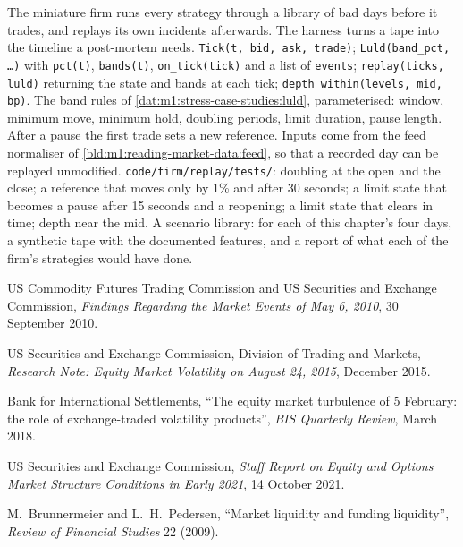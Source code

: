 \begin{build}
 The miniature firm runs every strategy through a library of
bad days before it trades, and replays its own incidents afterwards. The
harness turns a tape into the timeline a post-mortem needs.
 \texttt{Tick(t, bid, ask, trade)}; \texttt{Luld(band\_pct,
\ldots)} with \texttt{pct(t)}, \texttt{bands(t)}, \texttt{on\_tick(tick)} and a
list of \texttt{events}; \texttt{replay(ticks, luld)} returning the state and
bands at each tick; \texttt{depth\_within(levels, mid, bp)}.
 The band rules of \cref{dat:m1:stress-case-studies:luld},
parameterised: window, minimum move, minimum hold, doubling periods, limit
duration, pause length. After a pause the first trade sets a new reference.
Inputs come from the feed normaliser of
\cref{bld:m1:reading-market-data:feed}, so that a recorded day can be
replayed unmodified.
 \texttt{code/firm/replay/tests/}: doubling at the
open and the close; a reference that moves only by 1\% and after 30 seconds; a
limit state that becomes a pause after 15 seconds and a reopening; a limit
state that clears in time; depth near the mid.
 A scenario library: for each of this chapter's four days, a
synthetic tape with the documented features, and a report of what each of the
firm's strategies would have done.
\end{build}

\begin{omsources}
\item US Commodity Futures Trading Commission and US Securities and Exchange
Commission, \emph{Findings Regarding the Market Events of May 6, 2010}, 30
September 2010.
\item US Securities and Exchange Commission, Division of Trading and Markets,
\emph{Research Note: Equity Market Volatility on August 24, 2015}, December
2015.
\item Bank for International Settlements, ``The equity market turbulence of 5
February: the role of exchange-traded volatility products'', \emph{BIS
Quarterly Review}, March 2018.
\item US Securities and Exchange Commission, \emph{Staff Report on Equity and
Options Market Structure Conditions in Early 2021}, 14 October 2021.
\item M.~Brunnermeier and L.~H.~Pedersen, ``Market liquidity and funding
liquidity'', \emph{Review of Financial Studies} 22 (2009).
\end{omsources}

